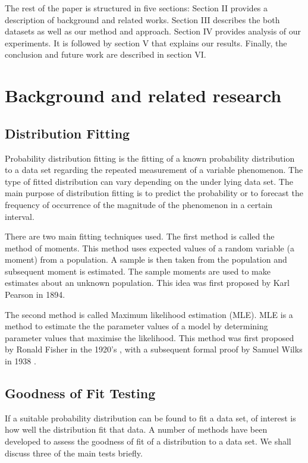\documentclass[conference]{IEEEtran}
\begin{document}
The rest of the paper is structured in five sections: Section II provides a description of background and related works. Section III describes the both datasets as well as our method and approach. Section IV provides analysis of our experiments. It is followed by section V that explains our results. Finally, the conclusion and future work are described in section VI. \par

\section{Background and related research}

\subsection{Distribution Fitting}

Probability distribution fitting is the fitting of a known probability distribution to a data set regarding the repeated measurement of a variable phenomenon. The type of fitted distribution can vary depending on the under lying data set. The main purpose of distribution fitting is to predict the probability or to forecast the frequency of occurrence of the magnitude of the phenomenon in a certain interval.

There are two main fitting techniques used. The first method is called the method of moments. This method uses expected values of a random variable (a moment) from a population. A sample is then taken from the population and subsequent moment is estimated. The sample moments are used to make estimates about an unknown population. This idea was first proposed by 
Karl Pearson in 1894\cite{pearson1894contributions}.

The second method is called Maximum likelihood estimation (MLE). MLE is a method to estimate the the parameter values of a model by determining parameter values that maximise the likelihood.  This method was first proposed by Ronald Fisher in the 1920's \cite{fisher1925theory}, with a subsequent formal proof by Samuel Wilks in 1938 \cite{wilks1938large}.

\subsection{Goodness of Fit Testing}

If a suitable probability distribution can be found to fit a data set, of interest is how well the distribution fit that data. A number of methods have been developed to assess the goodness of fit of a distribution to a data set. We shall discuss three of the main tests briefly.
\end{document}
